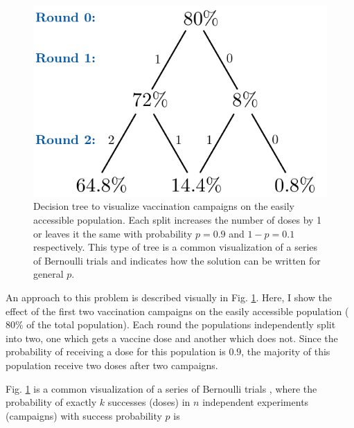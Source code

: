 \documentclass[prl,onecolumn,amsmath,amssymb,superscriptaddress,notitlepage]{revtex4-1}
\begin{document}
\begin{figure}[h!]
\centering
\includegraphics[scale=0.75]{q1_v2.pdf}
\caption{Decision tree to visualize vaccination campaigns on the easily accessible population. Each split increases the number of doses by 1 or leaves it the same with probability $p=0.9$ and $1-p=0.1$ respectively. This type of tree is a common visualization of a series of Bernoulli trials and indicates how the solution can be written for general $p$.}\label{tree}
\end{figure}
An approach to this problem is described visually in Fig. \ref{tree}. Here, I show the effect of the first two vaccination campaigns on the easily accessible population ($80\%$ of the total population). Each round the populations independently split into two, one which gets a vaccine dose and another which does not. Since the probability of receiving a dose for this population is $0.9$, the majority of this population receive two doses after two campaigns. 

Fig. \ref{tree} is a common visualization of a series of Bernoulli trials \cite{downey2014}, where the probability of exactly $k$ successes (doses) in $n$ independent experiments (campaigns) with success probability $p$ is
\end{document}
